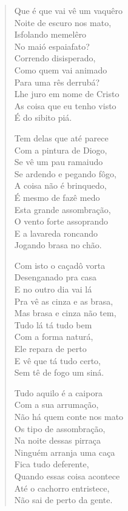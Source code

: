 \begin{verse}
Que é que vai vê um vaquêro\\
Noite de escuro nos mato,\\
Isfolando memelêro\\
No maió espaiafato?\\
Correndo disisperado,\\
Como quem vai animado\\
Para uma rês derrubá?\\
Lhe juro em nome de Cristo\\
As coisa que eu tenho visto\\
É do sibito piá.

Tem delas que até parece\\
Com a pintura de Diogo,\\
Se vê um pau ramaiudo\\
Se ardendo e pegando fôgo,\\
A coisa não é brinquedo,\\
É mesmo de fazê medo\\
Esta grande assombração,\\
O vento forte assoprando\\
E a lavareda roncando\\
Jogando brasa no chão.

Com isto o caçadô vorta\\
Desenganado pra casa\\
E no outro dia vai lá\\
Pra vê as cinza e as brasa,\\
Mas brasa e cinza não tem,\\
Tudo lá tá tudo bem\\
Com a forma naturá,\\
Ele repara de perto\\
E vê que tá tudo certo,\\
Sem tê de fogo um siná.

Tudo aquilo é a caipora\\
Com a sua arrumação,\\
Não há quem conte nos mato\\
Os tipo de assombração,\\
Na noite dessas pirraça\\
Ninguém arranja uma caça\\
Fica tudo deferente,\\
Quando essas coisa acontece\\
Até o cachorro entristece,\\
Não sai de perto da gente.


\end{verse}
